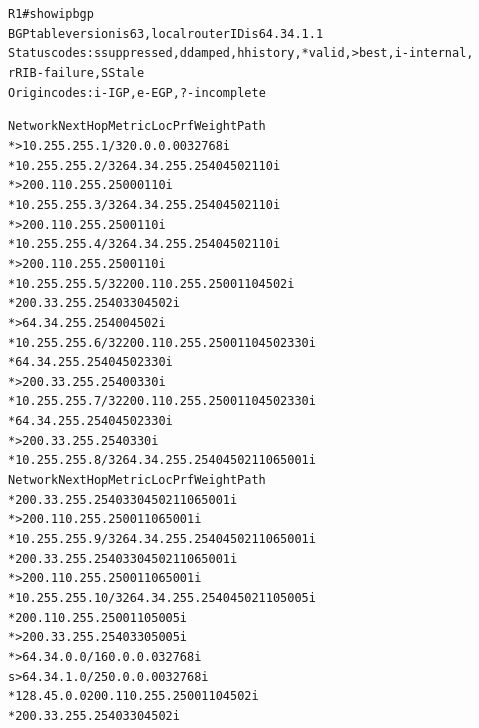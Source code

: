 \documentclass[12pt,twoside,a4paper]{report}
\begin{document}
\noindent
{\selectfont
\begin{small}
\begin{alltt}
R1#show ip bgp
BGP table version is 63, local router ID is 64.34.1.1
Status codes: s suppressed, d damped, h history, * valid, > best, i - internal,
              r RIB-failure, S Stale
Origin codes: i - IGP, e - EGP, ? - incomplete

   Network          Next Hop            Metric LocPrf Weight Path
*> 10.255.255.1/32  0.0.0.0                  0         32768 i
*  10.255.255.2/32  64.34.255.254                          0 4502 110 i
*>                  200.110.255.250          0             0 110 i
*  10.255.255.3/32  64.34.255.254                          0 4502 110 i
*>                  200.110.255.250                        0 110 i
*  10.255.255.4/32  64.34.255.254                          0 4502 110 i
*>                  200.110.255.250                        0 110 i
*  10.255.255.5/32  200.110.255.250                        0 110 4502 i
*                   200.33.255.254                         0 330 4502 i
*>                  64.34.255.254            0             0 4502 i
*  10.255.255.6/32  200.110.255.250                        0 110 4502 330 i
*                   64.34.255.254                          0 4502 330 i
*>                  200.33.255.254           0             0 330 i
*  10.255.255.7/32  200.110.255.250                        0 110 4502 330 i
*                   64.34.255.254                          0 4502 330 i
*>                  200.33.255.254                         0 330 i
*  10.255.255.8/32  64.34.255.254                          0 4502 110 65001 i
   Network          Next Hop            Metric LocPrf Weight Path
*                   200.33.255.254                         0 330 4502 110 65001 i
*>                  200.110.255.250                        0 110 65001 i
*  10.255.255.9/32  64.34.255.254                          0 4502 110 65001 i
*                   200.33.255.254                         0 330 4502 110 65001 i
*>                  200.110.255.250                        0 110 65001 i
*  10.255.255.10/32 64.34.255.254                          0 4502 110 5005 i
*                   200.110.255.250                        0 110 5005 i
*>                  200.33.255.254                         0 330 5005 i
*> 64.34.0.0/16     0.0.0.0                            32768 i
s> 64.34.1.0/25     0.0.0.0                  0         32768 i
*  128.45.0.0       200.110.255.250                        0 110 4502 i
*                   200.33.255.254                         0 330 4502 i

\end{alltt}
\end{small}}
\end{document}
